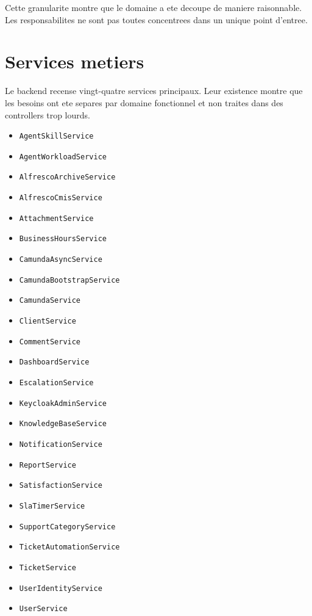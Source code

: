 \documentclass[12pt,a4paper,oneside]{report}
\begin{document}
Cette granularite montre que le domaine a ete decoupe de maniere raisonnable. Les responsabilites ne sont pas toutes concentrees dans un unique point d'entree.

\section{Services metiers}

Le backend recense vingt-quatre services principaux. Leur existence montre que les besoins ont ete separes par domaine fonctionnel et non traites dans des controllers trop lourds.

\begin{itemize}[leftmargin=1.2cm]
  \item \texttt{AgentSkillService}
  \item \texttt{AgentWorkloadService}
  \item \texttt{AlfrescoArchiveService}
  \item \texttt{AlfrescoCmisService}
  \item \texttt{AttachmentService}
  \item \texttt{BusinessHoursService}
  \item \texttt{CamundaAsyncService}
  \item \texttt{CamundaBootstrapService}
  \item \texttt{CamundaService}
  \item \texttt{ClientService}
  \item \texttt{CommentService}
  \item \texttt{DashboardService}
  \item \texttt{EscalationService}
  \item \texttt{KeycloakAdminService}
  \item \texttt{KnowledgeBaseService}
  \item \texttt{NotificationService}
  \item \texttt{ReportService}
  \item \texttt{SatisfactionService}
  \item \texttt{SlaTimerService}
  \item \texttt{SupportCategoryService}
  \item \texttt{TicketAutomationService}
  \item \texttt{TicketService}
  \item \texttt{UserIdentityService}
  \item \texttt{UserService}
\end{itemize}
\end{document}
